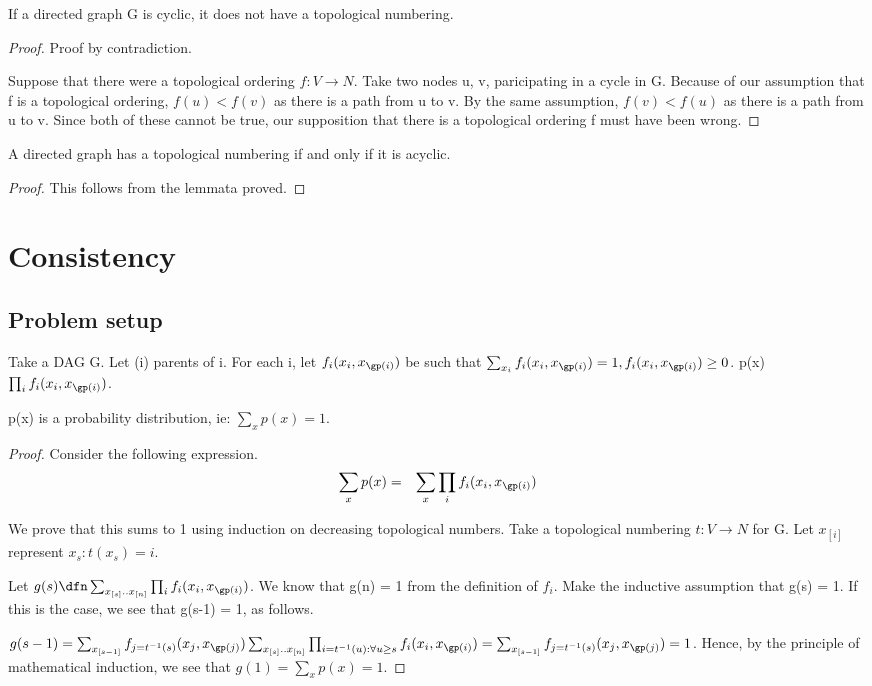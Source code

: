 \documentclass{article}
\begin{document}
\begin{lem}
If a directed graph G is cyclic, it does not have a topological numbering.
\end{lem}
\begin{proof}
Proof by contradiction.

Suppose that there were a topological ordering $f:V \to N$. Take two nodes u, v, paricipating in a cycle in G. Because of our assumption that f is a topological ordering, $f(u) < f(v)$ as there is a path from u to v. By the same assumption, $f(v) < f(u)$ as there is a path from u to v. Since both of these cannot be true, our supposition that there is a topological ordering f must have been wrong.
\end{proof}

\begin{thm}
 A directed graph has a topological numbering if and only if it is acyclic.
\end{thm}
\begin{proof}
This follows from the lemmata proved.
\end{proof}


\section{Consistency}
\subsection{Problem setup}
Take a DAG G. Let \gp(i) \dfn parents of i. For each i, let $f_i(x_i, x_{\gp(i)})$ be such that $\sum_{x_i} f_i(x_i, x_{\gp(i)}) = 1, f_i(x_i, x_{\gp(i)}) \geq 0$. p(x) \dfn $\prod_i f_i(x_i, x_{\gp(i)})$.

\begin{thm}
\label{thm_DAGSummation}
p(x) is a probability distribution, ie: $\sum_x p(x) = 1$.
\end{thm}
\begin{proof}
Consider the following expression.
\begin{eqnarray*}
\sum_x p(x) &=& \sum_x \prod_i f_i(x_i, x_{\gp(i)})\\
\end{eqnarray*}

We prove that this sums to 1 using induction on decreasing topological numbers. Take a topological numbering $t:V \to N$ for G. Let $x_{[i]}$ represent $x_s : t(x_s) = i$.

Let $g(s) \dfn \sum_{x_{[s]} .. x_{[n]}} \prod_i f_i(x_i, x_{\gp(i)})$. We know that g(n) = 1 from the definition of $f_i$. Make the inductive assumption that g(s) = 1. If this is the case, we see that g(s-1) = 1, as follows.

$g(s-1) = \sum_{x_{[s-1]}} f_{j=t^{-1}(s)}(x_j, x_{\gp(j)})\sum_{x_{[s]} .. x_{[n]}}\prod_{i = t^{-1}(u): \forall u \geq s} f_i(x_i, x_{\gp(i)}) = \sum_{x_{[s-1]}} f_{j=t^{-1}(s)}(x_j, x_{\gp(j)}) = 1$. Hence, by the principle of mathematical induction, we see that $g(1) = \sum_x p(x) = 1$.
\end{proof}
\end{document}
